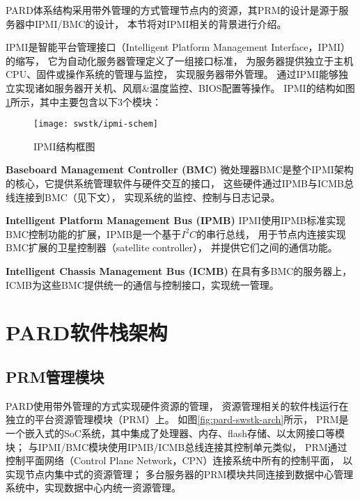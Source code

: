 PARD体系结构采用带外管理的方式管理节点内的资源，其PRM的设计是源于服务器中IPMI/BMC的设计，
本节将对IPMI相关的背景进行介绍。

IPMI是智能平台管理接口（Intelligent Platform Management Interface，IPMI）的缩写，
它为自动化服务器管理定义了一组接口标准\cite{ipmi}，
为服务器提供独立于主机CPU、固件或操作系统的管理与监控，
实现服务器带外管理。
通过IPMI能够独立实现诸如服务器开关机、风扇\&温度监控、BIOS配置等操作。
IPMI的结构如图\ref{fig:ipmi-schem}所示，其中主要包含以下3个模块：

\begin{figure}[tb]
  \centering
  \texttt{[image: swstk/ipmi-schem]}
  \caption{IPMI结构框图}
  \label{fig:ipmi-schem}
\end{figure}

\textbf{Baseboard Management Controller (BMC)}\quad
微处理器BMC是整个IPMI架构的核心，它提供系统管理软件与硬件交互的接口，
这些硬件通过IPMB与ICMB总线连接到BMC（见下文），
实现系统的监控、控制与日志记录。

\textbf{Intelligent Platform Management Bus (IPMB)}\quad
IPMI使用IPMB标准实现BMC控制功能的扩展，IPMB是一个基于$I^2C$的串行总线，
用于节点内连接实现BMC扩展的卫星控制器（satellite controller），
并提供它们之间的通信功能。

\textbf{Intelligent Chassis Management Bus (ICMB)}\quad
在具有多BMC的服务器上，ICMB为这些BMC提供统一的通信与控制接口，实现统一管理。


\section{PARD软件栈架构}

\subsection{PRM管理模块}
\label{chap:prm:arch}

PARD使用带外管理的方式实现硬件资源的管理，
资源管理相关的软件栈运行在独立的平台资源管理模块（PRM）上。
如图\ref{fig:pard-swstk-arch}所示，
PRM是一个嵌入式的SoC系统，其中集成了处理器、内存、flash存储、以太网接口等模块；
与IPMI/BMC模块使用IPMB/ICMB总线连接其控制单元类似，
PRM通过控制平面网络（Control Plane Network，CPN）连接系统中所有的控制平面，
以实现节点内集中式的资源管理；
多台服务器的PRM模块共同连接到数据中心管理系统中，实现数据中心内统一资源管理。

